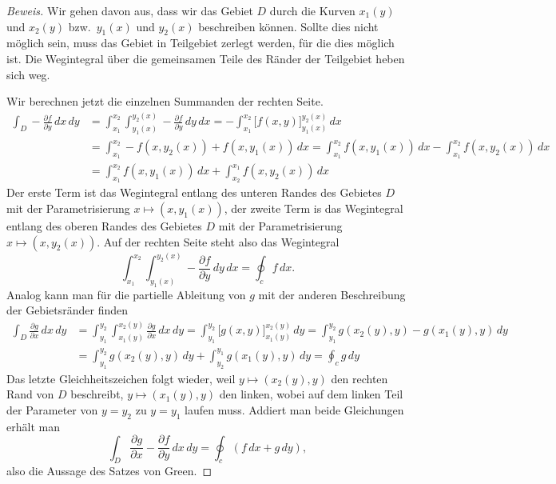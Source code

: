 \begin{proof}[Beweis]
Wir gehen davon aus, dass wir das Gebiet $D$ durch die Kurven $x_1(y)$
und $x_2(y)$ bzw.~$y_1(x)$ und $y_2(x)$ beschreiben können.
Sollte dies nicht möglich sein, muss das Gebiet in Teilgebiet zerlegt
werden, für die dies möglich ist.
Die Wegintegral über die gemeinsamen Teile des Ränder der Teilgebiet 
heben sich weg.

Wir berechnen jetzt die einzelnen Summanden der rechten Seite.
\begin{align*}
\int_D -\frac{\partial f}{\partial y}\,dx\,dy
&=
\int_{x_1}^{x_2}
\int_{y_1(x)}^{y_2(x)} -\frac{\partial f}{\partial y}\,dy \,dx
=
-\int_{x_1}^{x_2} \biggl[f(x,y)\biggr]_{y_1(x)}^{y_2(x)} 
\,dx
\\
&=
\int_{x_1}^{x_2} -f(x,y_2(x))+f(x,y_1(x))\,dx
=
\int_{x_1}^{x_2} f(x,y_1(x))\,dx - \int_{x_1}^{x_2} f(x,y_2(x))\,dx
\\
&=
\int_{x_1}^{x_2} f(x,y_1(x))\,dx + \int_{x_2}^{x_1} f(x,y_2(x))\,dx
\end{align*}
Der erste Term ist das Wegintegral entlang des unteren Randes des
Gebietes $D$ mit der Parametrisierung $x\mapsto(x,y_1(x))$,
der zweite Term is das Wegintegral entlang des oberen Randes des
Gebietes $D$ mit der Parametrisierung $x\mapsto(x,y_2(x))$.
Auf der rechten Seite steht also das Wegintegral 
\[
\int_{x_1}^{x_2}
\int_{y_1(x)}^{y_2(x)} -\frac{\partial f}{\partial y}\,dy \,dx
=
\oint_c f\,dx.
\]
Analog kann man für die partielle Ableitung von $g$ mit der anderen
Beschreibung der Gebietsränder finden
\begin{align*}
\int_D \frac{\partial g}{\partial x}\,dx\,dy
&=
\int_{y_1}^{y_2}
\int_{x_1(y)}^{x_2(y)} \frac{\partial g}{\partial x}\,dx\,dy
=
\int_{y_1}^{y_2} \biggl[g(x,y)\biggr]_{x_1(y)}^{x_2(y)} \,dy
=
\int_{y_1}^{y_2} g(x_2(y),y) - g(x_1(y),y) \,dy
\\
&=
\int_{y_1}^{y_2} g(x_2(y),y) \,dy + \int_{y_2}^{y_1} g(x_1(y),y)\,dy
=
\oint_c g\,dy
\end{align*}
Das letzte Gleichheitszeichen folgt wieder, weil $y\mapsto (x_2(y),y)$ den
rechten Rand von $D$ beschreibt, $y\mapsto (x_1(y),y)$ den linken,
wobei auf dem linken Teil der Parameter von $y=y_2$ zu $y=y_1$
laufen muss.
Addiert man beide Gleichungen erhält man
\[
\int_D \frac{\partial g}{\partial x}-\frac{\partial f}{\partial y}\,dx\,dy
=
\oint_c (f\,dx + g\,dy),
\]
also die Aussage des Satzes von Green.
\end{proof}

